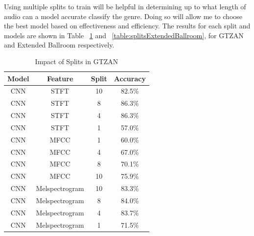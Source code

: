 \documentclass[10pt,twocolumn,letterpaper]{article}
\begin{document}
	Using multiple splits to train will be helpful in determining up to what length of audio can a model accurate classify the genre. Doing so will allow me to choose the best model based on effectiveness and efficiency. The results for each split and models are shown in Table ~\ref{table:splitsGTZAN} and ~\ref{table:splitsExtendedBallroom}, for GTZAN and Extended Ballroom respectively.
	
	\begin{table}[!htbp] %
		\caption{Impact of Splits in GTZAN}
		\centering
		\begin{tabular}[b]{cccc}
			\hline \hline
			Model & Feature & Split & Accuracy 		\\ [0.5ex]
			\hline
			CNN & STFT &  10 & 82.5\%				\\
			CNN & STFT &  8 & 86.3\%				\\
			CNN & STFT &  4 & 86.3\%				\\
			CNN & STFT &  1 & 57.0\%				\\
			CNN & MFCC &  1 & 60.0\%				\\
			CNN & MFCC &  4 & 67.0\%				\\
			CNN & MFCC &  8 & 70.1\%				\\
			CNN & MFCC &  10 & 75.9\%				\\
			CNN & Melspectrogram & 10 & 83.3\% 		\\
			CNN & Melspectrogram & 8 & 84.0\% 		\\
			CNN & Melspectrogram & 4 & 83.7\% 		\\
			CNN & Melspectrogram & 1 & 71.5\% 		\\ [1ex]
		\end{tabular}
	\label{table:splitsGTZAN}
	\end{table}
\end{document}
